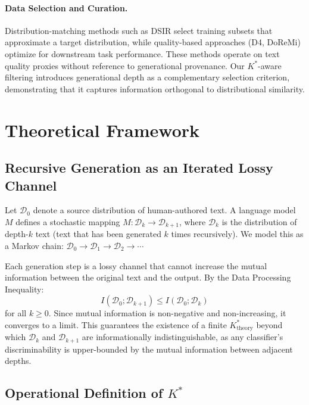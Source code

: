 \documentclass[11pt,a4paper]{article}
\newcommand{\Kstar}{K^{*}}
\newcommand{\Ktheory}{K^{*}_{\text{theory}}}
\begin{document}
\paragraph{Data Selection and Curation.}
Distribution-matching methods such as DSIR \citep{xie2023dsir} select training subsets that approximate a target distribution, while quality-based approaches (D4, DoReMi) optimize for downstream task performance. These methods operate on text quality proxies without reference to generational provenance. Our $\Kstar$-aware filtering introduces generational depth as a complementary selection criterion, demonstrating that it captures information orthogonal to distributional similarity.

\section{Theoretical Framework}
\label{sec:theory}

\subsection{Recursive Generation as an Iterated Lossy Channel}

Let $\mathcal{D}_0$ denote a source distribution of human-authored text. A language model $M$ defines a stochastic mapping $M: \mathcal{D}_k \to \mathcal{D}_{k+1}$, where $\mathcal{D}_k$ is the distribution of depth-$k$ text (text that has been generated $k$ times recursively). We model this as a Markov chain: $\mathcal{D}_0 \to \mathcal{D}_1 \to \mathcal{D}_2 \to \cdots$

Each generation step is a lossy channel that cannot increase the mutual information between the original text and the output. By the Data Processing Inequality:
\begin{equation}
    I(\mathcal{D}_0; \mathcal{D}_{k+1}) \leq I(\mathcal{D}_0; \mathcal{D}_k)
\end{equation}
for all $k \geq 0$. Since mutual information is non-negative and non-increasing, it converges to a limit. This guarantees the existence of a finite $\Ktheory$ beyond which $\mathcal{D}_k$ and $\mathcal{D}_{k+1}$ are informationally indistinguishable, as any classifier's discriminability is upper-bounded by the mutual information between adjacent depths.

\subsection{Operational Definition of $\Kstar$}
\end{document}
